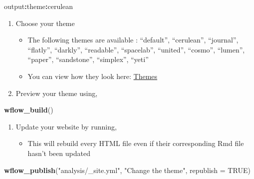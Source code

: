 \documentclass[openany]{article}
\newenvironment{Shaded}{\begin{snugshade}}{\end{snugshade}}
\newcommand{\DataTypeTok}[1]{\textcolor[rgb]{0.13,0.29,0.53}{#1}}
\newcommand{\KeywordTok}[1]{\textcolor[rgb]{0.13,0.29,0.53}{\textbf{#1}}}
\newcommand{\NormalTok}[1]{#1}
\newcommand{\OperatorTok}[1]{\textcolor[rgb]{0.81,0.36,0.00}{\textbf{#1}}}
\newcommand{\OtherTok}[1]{\textcolor[rgb]{0.56,0.35,0.01}{#1}}
\newcommand{\StringTok}[1]{\textcolor[rgb]{0.31,0.60,0.02}{#1}}
\providecommand{\tightlist}{%
  \setlength{\itemsep}{0pt}\setlength{\parskip}{0pt}}
\begin{document}
\begin{Shaded}
\begin{Highlighting}[]
\NormalTok{output}\OperatorTok{:}\NormalTok{theme}\OperatorTok{:}\NormalTok{cerulean}
\end{Highlighting}
\end{Shaded}

\begin{enumerate}
\def\labelenumi{\arabic{enumi}.}
\setcounter{enumi}{2}
\tightlist
\item
  Choose your theme

  \begin{itemize}
  \tightlist
  \item
    The following themes are available : ``default'', ``cerulean'', ``journal'', ``flatly'', ``darkly'', ``readable'', ``spacelab'', ``united'', ``cosmo'', ``lumen'', ``paper'', ``sandstone'', ``simplex'', ``yeti''
  \item
    You can view how they look here: \href{https://bootswatch.com/}{Themes}
  \end{itemize}
\item
  Preview your theme using,
\end{enumerate}

\begin{Shaded}
\begin{Highlighting}[]
\KeywordTok{wflow_build}\NormalTok{()}
\end{Highlighting}
\end{Shaded}

\begin{enumerate}
\def\labelenumi{\arabic{enumi}.}
\setcounter{enumi}{4}
\tightlist
\item
  Update your website by running,

  \begin{itemize}
  \tightlist
  \item
    This will rebuild every HTML file even if their corresponding Rmd file hasn't been updated
  \end{itemize}
\end{enumerate}

\begin{Shaded}
\begin{Highlighting}[]
\KeywordTok{wflow_publish}\NormalTok{(}\StringTok{"analysis/_site.yml"}\NormalTok{, }
    \StringTok{"Change the theme"}\NormalTok{, }\DataTypeTok{republish =} \OtherTok{TRUE}\NormalTok{)}
\end{Highlighting}
\end{Shaded}
\end{document}
